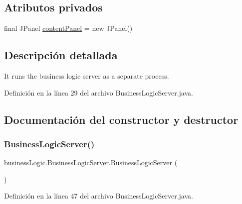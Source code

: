 \subsection*{Atributos privados}
\begin{DoxyCompactItemize}
\item 
final J\+Panel \mbox{\hyperlink{classbusinessLogic_1_1BusinessLogicServer_a0893f28ccaea8b86f7fe942c6ea3e126}{content\+Panel}} = new J\+Panel()
\end{DoxyCompactItemize}


\subsection{Descripción detallada}
It runs the business logic server as a separate process. 

Definición en la línea 29 del archivo Business\+Logic\+Server.\+java.



\subsection{Documentación del constructor y destructor}
\mbox{\label{classbusinessLogic_1_1BusinessLogicServer_a45e022d6b8b68567423caab4157e2784}} 
\subsubsection{\texorpdfstring{BusinessLogicServer()}{BusinessLogicServer()}}
{\footnotesize\ttfamily business\+Logic.\+Business\+Logic\+Server.\+Business\+Logic\+Server (\begin{DoxyParamCaption}{ }\end{DoxyParamCaption})}



Definición en la línea 47 del archivo Business\+Logic\+Server.\+java.


